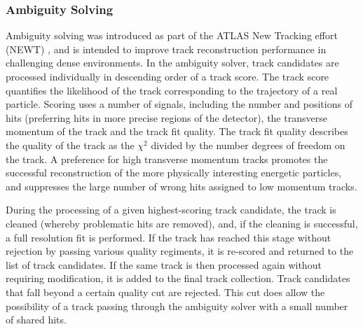 \subsubsection{Ambiguity Solving}
Ambiguity solving was introduced as part of the ATLAS New Tracking effort (NEWT) \cite{Cornelissen:2007vba}, and is intended to improve track reconstruction performance in challenging dense environments.
In the ambiguity solver, track candidates are processed individually in descending order of a track score. The track score quantifies the likelihood of the track corresponding to the trajectory of a real particle. Scoring uses a number of signals, including the number and positions of hits (preferring hits in more precise regions of the detector), the transverse momentum of the track and the track fit quality. The track fit quality describes the quality of the track as the $\chi^2$ divided by the number degrees of freedom on the track. A preference for high transverse momentum tracks promotes the successful reconstruction of the more physically interesting energetic particles, and suppresses the large number of wrong hits assigned to low momentum tracks.

During the processing of a given highest-scoring track candidate, the track is cleaned (whereby problematic hits are removed), and, if the cleaning is successful, a full resolution fit is performed. If the track has reached this stage without rejection by passing various quality regiments, it is re-scored and returned to the list of track candidates. If the same track is then processed again without requiring modification, it is added to the final track collection. Track candidates that fall beyond a certain quality cut are rejected. This cut does allow the possibility of a track passing through the ambiguity solver with a small number of shared hits.

